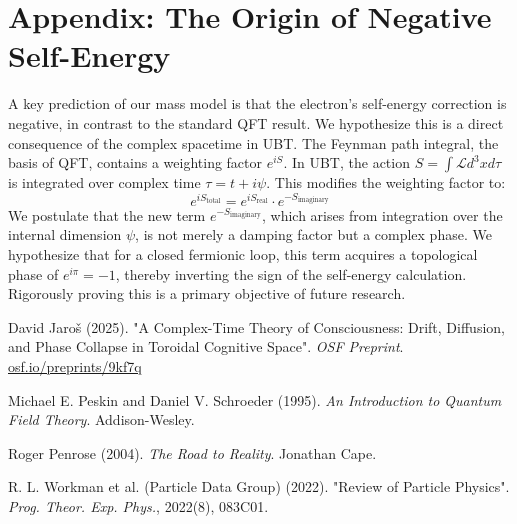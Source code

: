 \documentclass[12pt, a4paper]{article}
\begin{document}
\section{Appendix: The Origin of Negative Self-Energy}
A key prediction of our mass model is that the electron's self-energy correction is negative, in contrast to the standard QFT result. We hypothesize this is a direct consequence of the complex spacetime in UBT. The Feynman path integral, the basis of QFT, contains a weighting factor \(e^{iS}\). In UBT, the action \(S = \int \mathcal{L} d^3x d\tau\) is integrated over complex time \( \tau = t + i\psi \). This modifies the weighting factor to:
\[ e^{iS_{\text{total}}} = e^{iS_{\text{real}}} \cdot e^{-S_{\text{imaginary}}} \]
We postulate that the new term \(e^{-S_{\text{imaginary}}}\), which arises from integration over the internal dimension \(\psi\), is not merely a damping factor but a complex phase. We hypothesize that for a closed fermionic loop, this term acquires a topological phase of \(e^{i\pi} = -1\), thereby inverting the sign of the self-energy calculation. Rigorously proving this is a primary objective of future research.

\begin{thebibliography}{9}
David Jaroš (2025). "A Complex-Time Theory of Consciousness: Drift, Diffusion, and Phase Collapse in Toroidal Cognitive Space". \textit{OSF Preprint}. \href{https://osf.io/preprints/9kf7q/}{osf.io/preprints/9kf7q}

Michael E. Peskin and Daniel V. Schroeder (1995). \textit{An Introduction to Quantum Field Theory}. Addison-Wesley.

Roger Penrose (2004). \textit{The Road to Reality}. Jonathan Cape.

R. L. Workman et al. (Particle Data Group) (2022). "Review of Particle Physics". \textit{Prog. Theor. Exp. Phys.}, 2022(8), 083C01.

\end{thebibliography}
\end{document}
